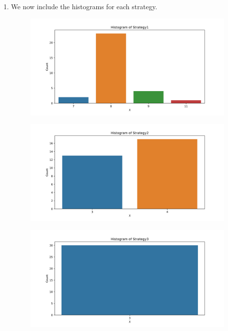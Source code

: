 \documentclass[12pt]{article}
\begin{document}
\begin{enumerate}[label=(\alph*)]
  \item We now include the histograms for each strategy.
  \begin{figure}
    \centering
    \includegraphics[scale=0.5]{figures/Strategy1.png}
  \end{figure}
  \begin{figure}
    \centering
    \includegraphics[scale=0.5]{figures/Strategy2.png}
  \end{figure}
  \begin{figure}
    \centering
    \includegraphics[scale=0.5]{figures/Strategy3.png}
  \end{figure}
  \begin{figure}

\end{figure}
\end{enumerate}
\end{document}
